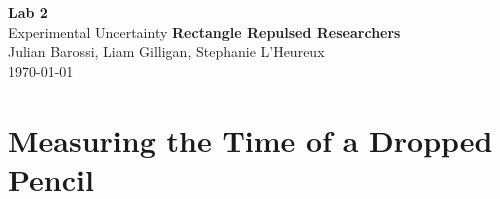 \documentclass[11pt, letterpaper, includehead]{article}
\begin{document}
  \begin{titlepage} 
    \begin{center}
      \Huge{\textbf{Lab 2}}\\
      \Huge{Experimental Uncertainty}
      \vfill
      \large{\textbf{Rectangle Repulsed Researchers}}\\
      \large{Julian Barossi, Liam Gilligan, Stephanie L'Heureux}\\
      \vspace{0.5cm}
      \normalsize
      \today
    \end{center}
  \end{titlepage}

  \tableofcontents
  \pagebreak %


  \pagestyle{fancy}
  \fancyhead{}

  \section{Measuring the Time of a Dropped Pencil} %
  
\end{document}
